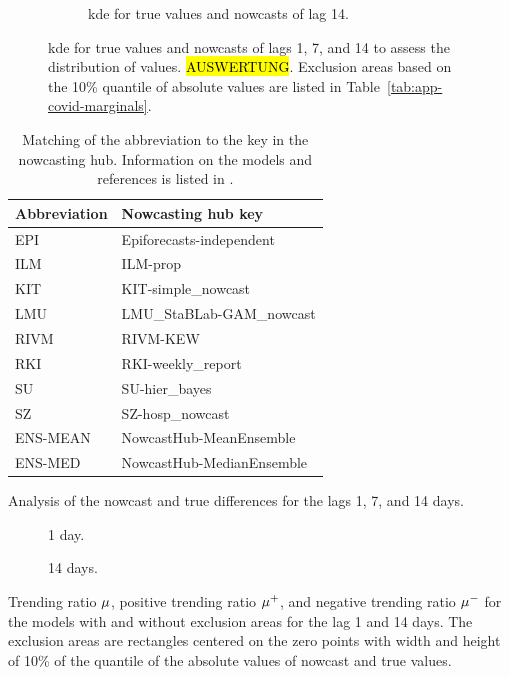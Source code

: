 \begin{figure}
\begin{subfigure}[t]{.48\textwidth}
        \caption{\ac{kde} for true values and nowcasts of lag 14.}
    \end{subfigure}
    \caption{\Ac{kde} for true values and nowcasts of lags 1, 7, and 14 to assess the distribution of values. \hl{AUSWERTUNG}. Exclusion areas based on the 10\%  quantile of absolute values are listed in Table~\ref{tab:app-covid-marginals}.}
    \label{fig:app-covid-kde}
\end{figure}


\begin{table}
    \centering
    \begin{tabular}{l l}
        \toprule
        Abbreviation & Nowcasting hub key \\
        \midrule
        EPI & Epiforecasts-independent \\
        ILM & ILM-prop \\
        KIT & KIT-simple\_nowcast \\
        LMU & LMU\_StaBLab-GAM\_nowcast \\
        RIVM & RIVM-KEW \\
        RKI & RKI-weekly\_report \\
        SU & SU-hier\_bayes \\
        SZ & SZ-hosp\_nowcast\\
        ENS-MEAN & NowcastHub-MeanEnsemble\\
        ENS-MED & NowcastHub-MedianEnsemble\\
        \bottomrule
    \end{tabular}
    \caption{Matching of the abbreviation to the key in the nowcasting hub. Information on the models and references is listed in \textcite[][Table 1]{Wolffram2023}.}
    \label{tab:app-covid-models}
\end{table}


\begin{table}
    \centering
    
    \caption{Analysis of the nowcast and true differences for the lags 1, 7, and 14 days.}
    \label{tab:app-covid-marginals}
\end{table}

\begin{table}
    \centering
    \begin{subfigure}[t]{\textwidth}
        
    \caption{1 day.}
    \end{subfigure}
    \begin{subfigure}[t]{\textwidth}
        
        \caption{14 days.}
    \end{subfigure}
    \caption{Trending ratio $\mu$, positive trending ratio $\mu^+$, and negative trending ratio $\mu^-$ for the models with and without exclusion areas for the lag 1 and 14 days. The exclusion areas are rectangles centered on the zero points with width and height of 10\% of the quantile of the absolute values of nowcast and true values. }
    \label{tab:app-covid-trending-ratios-lag-1-14}
\end{table}



